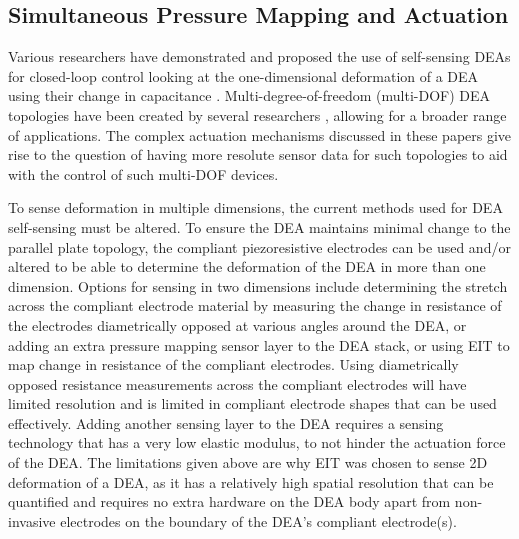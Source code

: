 \subsection{Simultaneous Pressure Mapping and Actuation}
\label{subsec:sensing_and_actuation}
Various researchers have demonstrated and proposed the use of self-sensing DEAs for closed-loop control looking at the one-dimensional deformation of a DEA using their change in capacitance \cite{Gisby2013, Liu2016, Huang2023, Koshiya2023} . Multi-degree-of-freedom (multi-DOF) DEA topologies have been created by several researchers \cite{Nguyen2017, Zhang2024, Zou2023, Pei2004} , allowing for a broader range of applications. The complex actuation mechanisms discussed in these papers give rise to the question of having more resolute sensor data for such topologies to aid with the control of such multi-DOF devices.

To sense deformation in multiple dimensions, the current methods used for DEA self-sensing must be altered. To ensure the DEA maintains minimal change to the parallel plate topology, the compliant piezoresistive electrodes can be used and/or altered to be able to determine the deformation of the DEA in more than one dimension. Options for sensing in two dimensions include determining the stretch across the compliant electrode material by measuring the change in resistance of the electrodes diametrically opposed at various angles around the DEA, or adding an extra pressure mapping sensor layer to the DEA stack, or using EIT to map change in resistance of the compliant electrodes. Using diametrically opposed resistance measurements across the compliant electrodes will have limited resolution and is limited in compliant electrode shapes that can be used effectively. Adding another sensing layer to the DEA requires a sensing technology that has a very low elastic modulus, to not hinder the actuation force of the DEA. The limitations given above are why EIT was chosen to sense 2D deformation of a DEA, as it has a relatively high spatial resolution that can be quantified and requires no extra hardware on the DEA body apart from non-invasive electrodes on the boundary of the DEA's compliant electrode(s).



